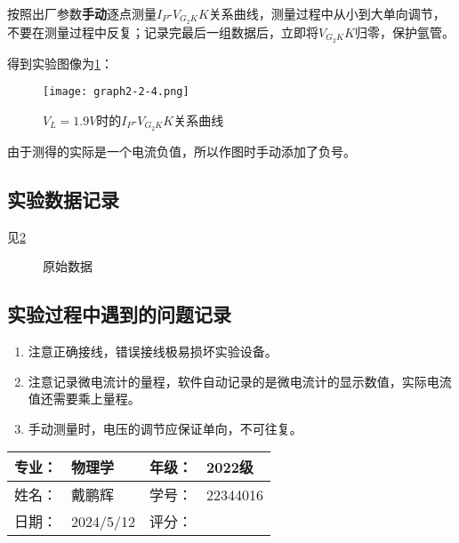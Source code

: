\documentclass[dvipsnames, svgnames,a4paper,11pt]{article}
\begin{document}
		按照出厂参数\textbf{手动}逐点测量$I_P$-$V_{G_2K}K$关系曲线，测量过程中从小到大单向调节，不要在测量过程中反复；记录完最后一组数据后，立即将$V_{G_2K}K$归零，保护氩管。

		得到实验图像为\cref{fig:graph2-2-4}：

		\begin{figure}[htbp]
			\centering
			\texttt{[image: graph2-2-4.png]}
			\caption{$V_L=1.9V$时的$I_P$-$V_{G_2K}K$关系曲线}
			\label{fig:graph2-2-4}
		\end{figure}


		由于测得的实际是一个电流负值，所以作图时手动添加了负号。



\subsection{实验数据记录}

	见\cref{fig:data}

	\begin{figure}[htbp]
		\centering
		\quad
		\quad


		\caption{原始数据}
		\label{fig:data}
	\end{figure}






\subsection{实验过程中遇到的问题记录}

\begin{enumerate}
	\item 注意正确接线，错误接线极易损坏实验设备。
	\item 注意记录微电流计的量程，软件自动记录的是微电流计的显示数值，实际电流值还需要乘上量程。
	\item 手动测量时，电压的调节应保证单向，不可往复。
	
\end{enumerate}
	

\clearpage
\begin{table}
	\renewcommand\arraystretch{1.7}
	\begin{tabularx}{\textwidth}{|X|X|X|X|}
	\hline
	专业：& 物理学 &年级：& 2022级\\
	\hline
	姓名： & 戴鹏辉 & 学号：& 22344016\\
	\hline
    日期：& 2024/5/12 & 评分： &\\
	\hline
	\end{tabularx}
\end{table}
\end{document}
